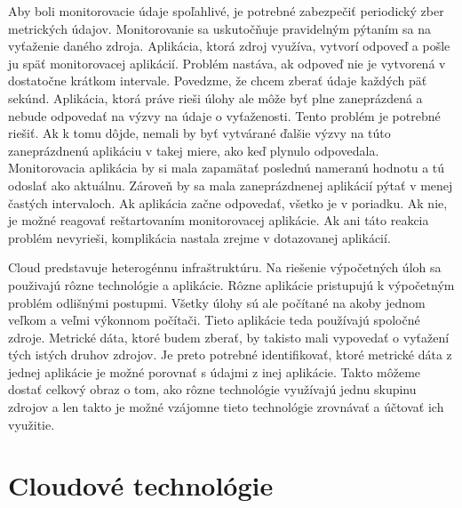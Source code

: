\documentclass[11pt,final,oneside]{fithesis}
\begin{document}
Aby boli monitorovacie údaje spoľahlivé, je potrebné zabezpečiť periodický zber metrických údajov. Monitorovanie sa uskutočňuje pravidelným pýtaním sa na vyťaženie daného zdroja. Aplikácia, ktorá zdroj
využíva, vytvorí odpoveď a pošle ju späť monitorovacej aplikácií. Problém nastáva, ak odpoveď nie je vytvorená v dostatočne krátkom intervale. Povedzme, že chcem zberať údaje každých päť sekúnd. Aplikácia,
ktorá práve rieši úlohy ale môže byť plne zaneprázdená a nebude odpovedať na výzvy na údaje o vyťaženosti. Tento problém je potrebné riešiť. Ak k tomu dôjde, nemali by byť vytvárané ďalšie výzvy na túto
zaneprázdnenú aplikáciu v takej miere, ako keď plynulo odpovedala. Monitorovacia aplikácia by si mala zapamätať poslednú nameranú hodnotu a tú odoslať ako aktuálnu. Zároveň by sa mala zaneprázdnenej aplikácií
pýtať v menej častých intervaloch. Ak aplikácia začne odpovedať, všetko je v poriadku. Ak nie, je možné reagovať reštartovaním monitorovacej aplikácie. Ak ani táto reakcia problém nevyrieši, komplikácia 
nastala zrejme v dotazovanej aplikácií.

Cloud predstavuje heterogénnu infraštruktúru. Na riešenie výpočetných úloh sa použivajú rôzne technológie a aplikácie. Rôzne aplikácie pristupujú k výpočetným problém odlišnými postupmi. Všetky úlohy 
sú ale počítané na akoby jednom veľkom a veľmi výkonnom počítači. Tieto aplikácie teda používajú spoločné zdroje. Metrické dáta, ktoré budem zberať, by takisto mali vypovedať o vyťažení tých istých druhov 
zdrojov. Je preto potrebné identifikovať, ktoré metrické dáta z jednej aplikácie je možné porovnať s údajmi z inej aplikácie. Takto môžeme dostať celkový obraz o tom, ako rôzne technológie využívajú
jednu skupinu zdrojov a len takto je možné vzájomne tieto technológie zrovnávať a účtovať ich využitie. 



\chapter{Cloudové technológie}
\end{document}
